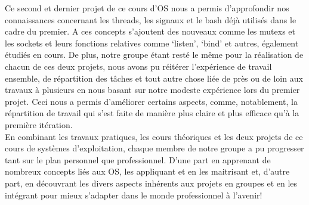 \documentclass[utf8]{article}
\begin{document}
Ce second et dernier projet de ce cours d'OS nous a permis d'approfondir nos connaissances concernant les threads, les signaux et le bash déjà utilisés dans le cadre du premier. A ces concepts
s'ajoutent des nouveaux comme les mutexs et les sockets et leurs fonctions relatives comme `listen', `bind' et autres, également étudiés en cours. De plus, notre groupe étant resté le même pour la
réalisation de chacun de ces deux projets, nous avons pu réitérer l'expérience de travail ensemble, de répartition des tâches et tout autre chose liée de près ou de loin aux travaux à plusieurs 
en nous basant sur notre modeste expérience lors du premier projet. Ceci nous a permis d'améliorer certains aspects, comme, notablement, la répartition de travail qui s'est faite de manière plus claire et plus
efficace qu'à la première itération. \\
En combinant les travaux pratiques, les cours théoriques et les deux projets de ce cours de systèmes d'exploitation, chaque membre de notre groupe a pu progresser tant sur le plan personnel que professionnel. 
D'une part en apprenant de nombreux concepts liés aux OS, les appliquant et en les maitrisant et, d'autre part, en découvrant les divers aspects inhérents aux projets en groupes et en les intégrant 
pour mieux s'adapter dans le monde professionnel à l'avenir!
\end{document}
